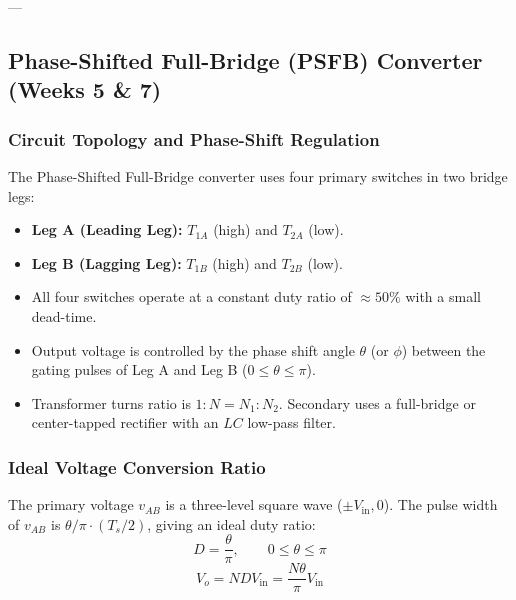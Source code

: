 ---

\subsection{Phase-Shifted Full-Bridge (PSFB) Converter (Weeks 5 \& 7)}

\subsubsection{Circuit Topology and Phase-Shift Regulation}
The Phase-Shifted Full-Bridge converter uses four primary switches in two bridge legs:
\begin{itemize}
  \item \textbf{Leg A (Leading Leg):} $T_{1A}$ (high) and $T_{2A}$ (low).
  \item \textbf{Leg B (Lagging Leg):} $T_{1B}$ (high) and $T_{2B}$ (low).
  \item All four switches operate at a constant duty ratio of $\approx 50\%$ with a small dead-time.
  \item Output voltage is controlled by the phase shift angle $\theta$ (or $\phi$) between the gating pulses of Leg A and Leg B ($0 \le \theta \le \pi$).
  \item Transformer turns ratio is $1:N = N_1:N_2$. Secondary uses a full-bridge or center-tapped rectifier with an $LC$ low-pass filter.
\end{itemize}

\subsubsection{Ideal Voltage Conversion Ratio}
The primary voltage $v_{AB}$ is a three-level square wave ($\pm V_{\mathrm{in}}, 0$). The pulse width of $v_{AB}$ is $\theta / \pi \cdot (T_s/2)$, giving an ideal duty ratio:
\begin{equation}
D = \frac{\theta}{\pi}, \qquad 0 \le \theta \le \pi
\end{equation}
\begin{equation}
V_o = N D V_{\mathrm{in}} = \frac{N \theta}{\pi} V_{\mathrm{in}}
\end{equation}

